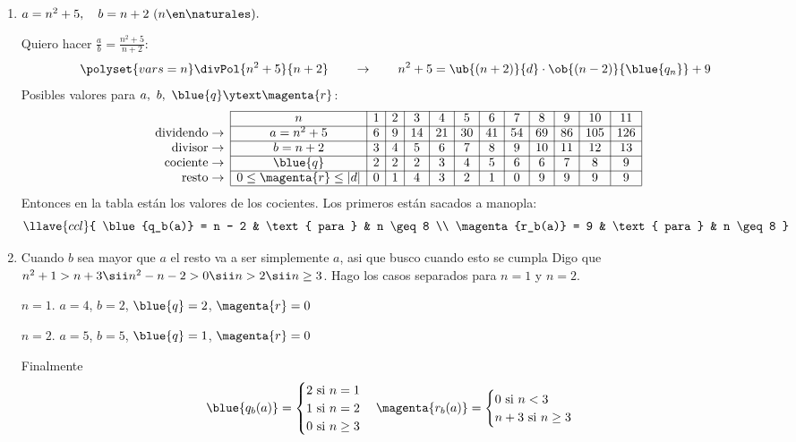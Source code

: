 \begin{enumerate}[label=\alph*)]
  \item $a = n^2 + 5,\quad b = n + 2 \ (n \en \naturales).$

        Quiero hacer $\frac{a}{b} = \frac{n^2 + 5}{n + 2}$:
        $$
          \polyset{vars=n}
          \divPol{n^2 + 5}{n + 2}
          \qquad \to \qquad
          n^2 + 5 = \ub{(n + 2)}{d} \cdot \ob{(n - 2)}{\blue{q_n}} + 9
        $$
        Posibles valores para $a,\ b,\ \blue{q} \ytext \magenta{r}$:
        $$
          \begin{array}{r|c|c|c|c|c|c|c|c|c|c|c|c|c|c} \cline{2-13}
                                & n                           & 1 & 2 & 3  & 4  & 5  & 6  & 7  & 8  & 9  & 10  & 11  \\ \cline{2-13}
            \text{dividendo}\to & a = n^2 + 5                 & 6 & 9 & 14 & 21 & 30 & 41 & 54 & 69 & 86 & 105 & 126 \\ \cline{2-13}
            \text{divisor}  \to & b = n + 2                   & 3 & 4 & 5  & 6  & 7  & 8  & 9  & 10 & 11 & 12  & 13  \\ \cline{2-13}
            \text{cociente} \to & \blue{q}                    & 2 & 2 & 2  & 3  & 4  & 5  & 6  & 6  & 7  & 8   & 9   \\ \cline{2-13}
            \text{resto}    \to & 0 \leq \magenta{r} \leq |d| & 0 & 1 & 4  & 3  & 2  & 1  & 0  & 9  & 9  & 9   & 9   \\ \cline{2-13}
          \end{array}
        $$
        Entonces en la tabla están los valores de los cocientes. Los primeros están sacados a manopla:
        $$
          \llave{ccl}{
            \blue{q_b(a)} = n - 2 & \text{ para } & n \geq 8 \\
            \magenta{r_b(a)} = 9 & \text{ para } & n \geq 8
          }
        $$

  \item Cuando $b$ sea mayor que $a$ el resto va a ser simplemente $a$, asi que busco cuando esto se cumpla
  Digo que $n^2 + 1 > n + 3 \sii n^2 - n - 2 > 0 \sii n > 2 \sii n \geq 3$. Hago los casos separados para $n = 1$ y $n = 2$. 

  $n = 1$. $a = 4$, $b=2$, $\blue{q} = 2$, $\magenta{r} = 0$

  $n = 2$. $a = 5$, $b=5$, $\blue{q} = 1$, $\magenta{r} = 0$

  Finalmente 
  $$
  \blue{q_b(a)} = 
  \begin{cases}
  2 \text{ si } n = 1 \\
  1 \text{ si } n = 2 \\
  0 \text{ si } n \geq 3 
  \end{cases}
  \magenta{r_b(a)} =
  \begin{cases}
  0 \text{ si } n < 3 \\
  n + 3 \text{ si } n \geq 3
  \end{cases}
  $$

\end{enumerate}

\begin{aportes}
  \item {}
  \item {}
\end{aportes}
